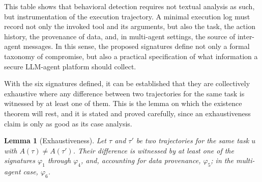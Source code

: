 \documentclass[journal]{IEEEtran}
\newtheorem{lemma}{Lemma}
\theoremstyle{remark}
\begin{document}
This table shows that behavioral detection requires not textual analysis as such, but instrumentation of the execution trajectory. A minimal execution log must record not only the invoked tool and its arguments, but also the task, the action history, the provenance of data, and, in multi-agent settings, the source of inter-agent messages. In this sense, the proposed signatures define not only a formal taxonomy of compromise, but also a practical specification of what information a secure LLM-agent platform should collect.

With the six signatures defined, it can be established that they are collectively exhaustive where any difference between two trajectories for the same task is witnessed by at least one of them. This is the lemma on which the existence theorem will rest, and it is stated and proved carefully, since an exhaustiveness claim is only as good as its case analysis.

\begin{lemma}[Exhaustiveness]
Let $\tau$ and $\tau'$ be two trajectories for the same task $u$ with $A(\tau)\neq A(\tau')$. Their difference is witnessed by at least one of the signatures $\varphi_1$ through $\varphi_4$, and, accounting for data provenance, $\varphi_5$; in the multi-agent case, $\varphi_6$.
\end{lemma}
\end{document}
